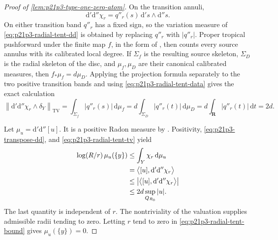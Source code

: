 \begin{proof}[Proof of \cref{lem:p21p3-type-one-zero-atom}]
On the transition annuli,
\begin{equation}
\label{eq:p21p3-radial-tent-dd}
 \mathrm d'\mathrm d''\chi_r
   =q''_r(s)\,
        \mathrm d' s\wedge\mathrm d'' s .
\end{equation}
On either transition band \(q''_r\) has a fixed sign, so the variation
measure of \eqref{eq:p21p3-radial-tent-dd} is obtained by replacing
\(q''_r\) with \(|q''_r|\).  Proper tropical pushforward under the finite
map \(f\), in the form of \cite[Proposition~14.4.2]{CLD25}, then counts
every source annulus with its calibrated local degree.  If
\(\Sigma_f\) is the resulting source skeleton, \(\Sigma_D\) is the radial
skeleton of the disc, and \(\mu_f,\mu_D\) are their canonical calibrated
measures, then \(f_*\mu_f=d\mu_D\).  Applying the projection formula
separately to the two positive transition bands and using
\eqref{eq:p21p3-radial-tent-data} gives the exact calculation
\begin{equation}
\label{eq:p21p3-radial-tent-tv}
 \left\|\mathrm d'\mathrm d''\chi_r\wedge\delta_Y\right\|_{\mathrm{TV}}
 =\int_{\Sigma_f}|q''_r(s)|\,\mathrm d\mu_f
 =d\int_{\Sigma_D}|q''_r(t)|\,\mathrm d\mu_D
 =d\int_{\mathbf R}|q''_r(t)|\,\mathrm dt=2d .
\end{equation}

Let \(\mu_u=\mathrm d'\mathrm d''[u]\).  It is a positive Radon measure
by \cite[Lemma~8.5.5 and Proposition~7.2.8]{CLD25}.  Positivity,
\eqref{eq:p21p3-transpose-dd}, and
\eqref{eq:p21p3-radial-tent-tv} yield
\begin{align}
 \log(R/r)\,\mu_u(\{y\})
 &\leq
    \int_Y\chi_r\,\mathrm d\mu_u                                                       \notag\\
 &= \bigl\langle [u],
            \mathrm d'\mathrm d''\chi_r\bigr\rangle                                    \notag\\
 &\leq
   \left|\bigl\langle [u],
            \mathrm d'\mathrm d''\chi_r\bigr\rangle\right|                             \notag\\
 &\leq
   2d\sup_{Q_{R_0}}|u|.
\label{eq:p21p3-radial-tent-bound}
\end{align}
The last quantity is independent of \(r\).  The nontriviality of the
valuation supplies admissible radii tending to zero.  Letting \(r\) tend to zero
in \eqref{eq:p21p3-radial-tent-bound} gives
\(\mu_u(\{y\})=0\).
\end{proof}

